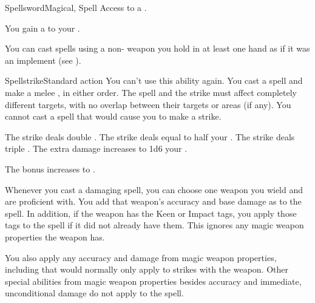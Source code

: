   \begin{magicalfeat}{Spellsword}{Magical, Spell}
    \featpre Access to a .

     You gain a   to your .

     You can cast spells using a non- weapon you hold in at least one hand as if it was an implement (see ).

    \begin{magicalactiveability}{Spellstrike}{Standard action}
      \abilitycost You \briefly can't use this ability again.
      \rankline
      You cast a spell and make a  melee , in either order.
      The spell and the strike must affect completely different targets, with no overlap between their targets or areas (if any).
      You cannot cast a spell that would cause you to make a strike.

      \rankline
       The strike deals double .
       The strike deals  equal to half your .
       The strike deals triple .
       The extra damage increases to 1d6 \add your .
    \end{magicalactiveability}

     The bonus increases to .

     Whenever you cast a damaging spell, you can choose one weapon you wield and are proficient with.
    You add that weapon's accuracy and base damage as  to the spell.
    In addition, if the weapon has the Keen or Impact tags, you apply those tags to the spell if it did not already have them.
    This ignores any magic weapon properties the weapon has.

     You also apply any accuracy and damage from magic weapon properties, including  that would normally only apply to strikes with the weapon.
    Other special abilities from magic weapon properties besides accuracy and immediate, unconditional damage do not apply to the spell.
  \end{magicalfeat}

